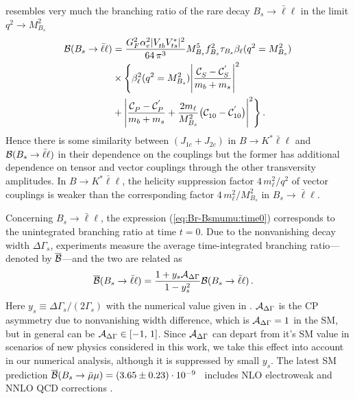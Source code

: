 \documentclass[twocolumn,epjc3]{svjour3}
\numberwithin{equation}{section}
\def \refeq#1{(\ref{#1})}
\newcommand{\wilson}[2][{}]{\mathcal{C}_{#2}^{\mathrm{#1}}}
\renewcommand{\[}{\big[}
\renewcommand{\]}{\big]}
\renewcommand{\(}{\big(}
\renewcommand{\)}{\big)}
\begin{document}
 resembles very much the branching ratio of the rare
decay $B_s \to \bar\ell\ell$ in the limit $q^2 \to M_{B_s}^2$
\begin{align}
\label{eq:Br-Bsmumu:time0}
  {\cal B}(B_s \to \bar\ell\ell) &=
    \frac{G_F^2 \alpha_e^2 |V_{tb}^{} V_{ts}^*|^2}{64\, \pi^3}
    M_{B_s}^5 f_{B_s}^2 \tau_{B_s} \beta_\ell(q^2 = M_{B_s}^2)
\nonumber\\
    & \times \Bigg\{
    \beta_\ell^2(q^2 = M_{B_s}^2) \Bigg|\frac{\wilson[]{S} - \wilson[']{S}}{m_b + m_s}\Bigg|^2 \nonumber\\
    &+ \Bigg|\frac{\wilson[]{P} - \wilson[']{P}}{m_b + m_s}
     + \frac{2 m_\ell}{M_{B_s}^2} \big(\wilson[]{10} - \wilson[']{10}\big) \Bigg|^2
    \Bigg\}\,.
  \end{align}
  Hence there is some similarity between $(J_{1c} + J_{2c})$ in $B \to K^*
  \bar\ell\ell$ and ${\cal B}(B_s \to \bar\ell\ell)$ in their dependence on the
  couplings but the former has additional dependence on tensor and vector
  couplings through the other transversity amplitudes.  In $B \to K^*
  \bar\ell\ell$, the helicity suppression factor $4\,m_\ell^2/q^2$ of vector
  couplings is weaker than the corresponding factor $4\,m_\ell^2/M_{B_s}^2$ in
  $B_s \to \bar\ell\ell$.

  Concerning $B_s\to \bar\ell\ell$, the expression \refeq{eq:Br-Bsmumu:time0}
  corresponds to the unintegrated branching ratio at time $t=0$. Due to the
  nonvanishing decay width $\Delta\Gamma_s$, experiments measure the average
  time-integrated branching ratio---denoted by $\overline{\cal B}$---and the two
  are related as \cite{DeBruyn:2012wk}
\begin{align}
  \label{eq:Br-Bsmumu}
  \overline{\cal B} (B_s \to \bar\ell\ell) &
  = \frac{1 + y_s {\cal A}_{\Delta\Gamma}}{1 - y_s^2} {\cal B} (B_s \to \bar\ell\ell)\,.
\end{align}
Here $y_s \equiv \Delta\Gamma_s/(2\Gamma_s)$ with the numerical value given in
\cite{Beaujean:2013soa}. ${\cal A}_{\Delta\Gamma}$ is the CP asymmetry
due to nonvanishing width difference, which is ${\cal A}_{\Delta\Gamma} = 1$
in the SM, but in general can be ${\cal A}_{\Delta\Gamma} \in [-1,\, 1]$.
Since ${\cal A}_{\Delta\Gamma}$ can depart from it's SM value in scenarios of
new physics considered in this work, we take this effect into account
in our numerical analysis, although it is suppressed by small $y_s$. The latest
SM prediction $\overline{\cal B} (B_s \to \bar\mu\mu) = (3.65 \pm 0.23) \cdot
10^{-9}$~\cite{Bobeth:2013uxa} includes NLO electroweak \cite{Bobeth:2013tba}
and NNLO QCD corrections \cite{Hermann:2013kca}.
\end{document}
